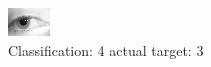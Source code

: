 \begin{figure}[h!]
\begin{center}
\includegraphics[width=0.60\columnwidth]{figures/ID1387_class_4_target_3.png}
\end{center}
\caption{ Classification: 4 actual target: 3}
\label{fig:ID1387_class_4_target_3}
\end{figure}
